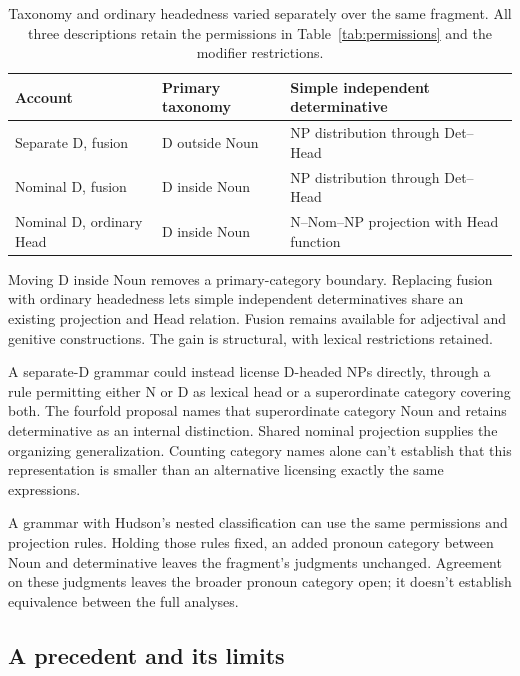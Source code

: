 \documentclass[12pt]{article}
\begin{document}
\begin{table}[tb]
\centering\small
\caption{Taxonomy and ordinary headedness varied separately over the same fragment. All three descriptions retain the permissions in Table~\ref{tab:permissions} and the modifier restrictions.}\label{tab:economy}
\begin{tabular}{>{\raggedright\arraybackslash}p{3.1cm}>{\raggedright\arraybackslash}p{3.9cm}>{\raggedright\arraybackslash}p{4.7cm}}
\toprule
Account & Primary taxonomy & Simple independent determinative \\
\midrule
Separate D, fusion & D outside Noun & NP distribution through Det--Head \\
Nominal D, fusion & D inside Noun & NP distribution through Det--Head \\
Nominal D, ordinary Head & D inside Noun & N--Nom--NP projection with Head function \\
\bottomrule
\end{tabular}
\end{table}

Moving D inside Noun removes a primary-category boundary. Replacing fusion with ordinary headedness lets simple independent determinatives share an existing projection and Head relation. Fusion remains available for adjectival and genitive constructions. The gain is structural, with lexical restrictions retained.

A separate-D grammar could instead license D-headed NPs directly, through a rule permitting either N or D as lexical head or a superordinate category covering both. The fourfold proposal names that superordinate category Noun and retains determinative as an internal distinction. Shared nominal projection supplies the organizing generalization. Counting category names alone can't establish that this representation is smaller than an alternative licensing exactly the same expressions.

A grammar with Hudson's nested classification can use the same permissions and projection rules. Holding those rules fixed, an added pronoun category between Noun and determinative leaves the fragment's judgments unchanged. Agreement on these judgments leaves the broader pronoun category open; it doesn't establish equivalence between the full analyses.

\subsection{A precedent and its limits}
\end{document}

